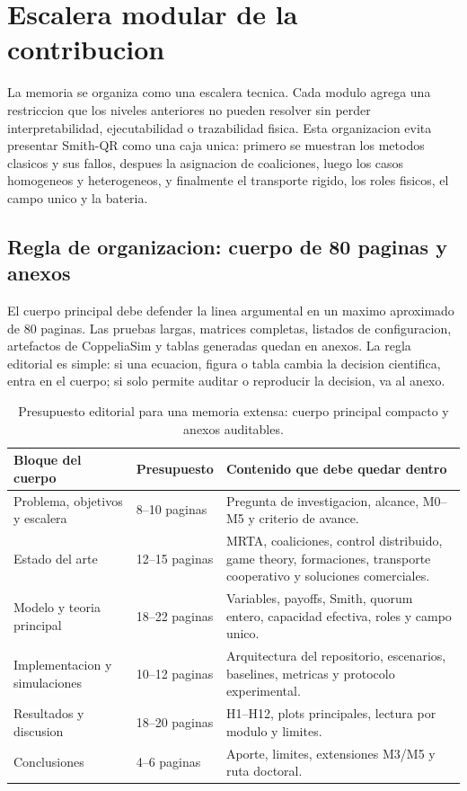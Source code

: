 \section{Escalera modular de la contribucion}
\label{sec:escalera-modular}

La memoria se organiza como una escalera tecnica. Cada modulo agrega una restriccion que
los niveles anteriores no pueden resolver sin perder interpretabilidad, ejecutabilidad o
trazabilidad fisica. Esta organizacion evita presentar Smith-QR como una caja unica:
primero se muestran los metodos clasicos y sus fallos, despues la asignacion de
coaliciones, luego los casos homogeneos y heterogeneos, y finalmente el transporte
rigido, los roles fisicos, el campo unico y la bateria.

\subsection{Regla de organizacion: cuerpo de 80 paginas y anexos}

El cuerpo principal debe defender la linea argumental en un maximo aproximado de 80
paginas. Las pruebas largas, matrices completas, listados de configuracion, artefactos
de CoppeliaSim y tablas generadas quedan en anexos. La regla editorial es simple: si una
ecuacion, figura o tabla cambia la decision cientifica, entra en el cuerpo; si solo
permite auditar o reproducir la decision, va al anexo.

\begin{table}[H]
\centering
\footnotesize
\begin{tabularx}{\textwidth}{@{}p{}p{}Y@{}}
\toprule
Bloque del cuerpo & Presupuesto & Contenido que debe quedar dentro \\
\midrule
Problema, objetivos y escalera & 8--10 paginas & Pregunta de investigacion, alcance, M0--M5 y criterio de avance. \\
Estado del arte & 12--15 paginas & MRTA, coaliciones, control distribuido, game theory, formaciones, transporte cooperativo y soluciones comerciales. \\
Modelo y teoria principal & 18--22 paginas & Variables, payoffs, Smith, quorum entero, capacidad efectiva, roles y campo unico. \\
Implementacion y simulaciones & 10--12 paginas & Arquitectura del repositorio, escenarios, baselines, metricas y protocolo experimental. \\
Resultados y discusion & 18--20 paginas & H1--H12, plots principales, lectura por modulo y limites. \\
Conclusiones & 4--6 paginas & Aporte, limites, extensiones M3/M5 y ruta doctoral. \\
\bottomrule
\end{tabularx}
\caption{Presupuesto editorial para una memoria extensa: cuerpo principal compacto y anexos auditables.}
\label{tab:presupuesto-80-paginas}
\end{table}

